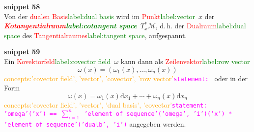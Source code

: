 \documentclass[a4paper,twoside,english,ngerman,deutsch,german,sectrefs,envcountsame,envcountchap]{svmono}
\newcommand{\setref}[2]{\textcolor{red}{#1}\textcolor{green}{#2}}
\newcommand{\snippet}[1]{\textbf{snippet #1}\\}
\newcommand{\eqnote}[2]{\textcolor{orange}{#1}\textcolor{magenta}{\texttt{#2}}}
\begin{document}
\snippet{58}
Von der \setref{dualen Basis}{label:dual basis} wird im \setref{Punkt}{label:vector}~$x$ der \textbf{\em \setref{Kotangential\-raum}{label:cotangent space}}~$T_{x}^{*}\mathcal{M}$, d.\,h. der \setref{Dualraum}{label:dual space} des \setref{Tangentialraumes}{label:tangent space}, aufgespannt.

\snippet{59}
Ein \setref{Kovektorfeld}{label:covector field}~$\omega$ kann dann als \setref{Zeilenvektor}{label:row vector}
\[
\omega(x)=\left(\omega_{1}(x),\ldots,\omega_{n}(x)\right)
\]\eqnote{concepts:'covector field', 'vector', 'covector', 'row vector'}{statement: }
oder in der Form
\begin{equation}
\omega(x)=\omega_{1}(x){\mathrm{d}} x_{1}+\cdots+\omega_{n}(x){\mathrm{d}} x_{n}\label{eq:Basisdarstellung-Kovektorfelder}
\end{equation}\eqnote{concepts:'covector field', 'vector', 'dual basis', 'covector'}{statement: 'omega'('x') == $\sum_{i=1}^n$ 'element of sequence'('omega', 'i')('x') * 'element of sequence'('dualb', 'i')}
angegeben werden.
\end{document}
